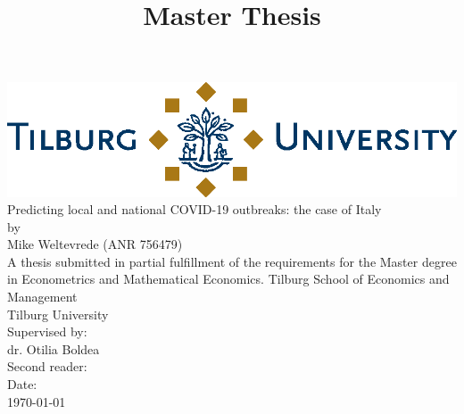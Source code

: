 \documentclass[12pt]{article}
\title{Master Thesis}
\newcommand\blankpage{
	\null
	\thispagestyle{empty}
	\addtocounter{page}{-1}
	\newpage}
\begin{document}
	
	\afterpage{\blankpage}
	
	\begin{titlepage}
		\centering
		
		\vfill
		
		\includegraphics[width=0.94\linewidth]{output/TiuLogo.eps}
		\vskip1.5cm
		{\huge
			Predicting local and national COVID-19 outbreaks: the case of Italy \\
			\large\bigskip
			by\\
			Mike Weltevrede (ANR 756479)\\
			\vskip1.5cm
			A thesis submitted in partial fulfillment of the requirements for the Master degree in Econometrics and Mathematical Economics.
			\vskip0.5cm
			Tilburg School of Economics and Management\\
			Tilburg University\\
			\vskip1.5cm
			Supervised by:\\
			dr. Otilia Boldea \\
			\vskip0.5cm
			Second reader:\\
			\vfill
			Date:\\
			\today
		}   
		\vfill
		\vfill
	\end{titlepage}
	
	\newpage
	
	\newpage
	
\end{document}
